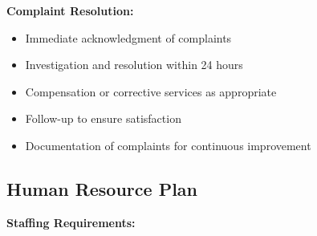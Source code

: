 \documentclass[a4paper,12pt]{article}
\begin{document}
\textbf{Complaint Resolution:}
\begin{itemize}[leftmargin=2em]
    \item Immediate acknowledgment of complaints
    \item Investigation and resolution within 24 hours
    \item Compensation or corrective services as appropriate
    \item Follow-up to ensure satisfaction
    \item Documentation of complaints for continuous improvement
\end{itemize}

\subsection{Human Resource Plan}

\textbf{Staffing Requirements:}
\end{document}
